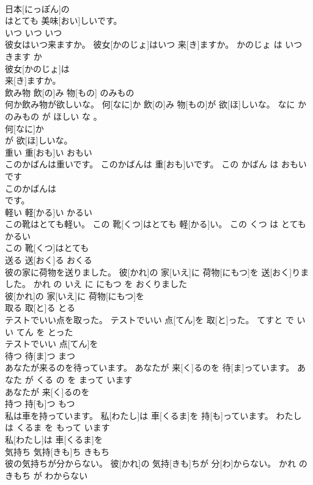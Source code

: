 \documentclass[8pt]{extreport}
\begin{document}
\begin{CJK}{UTF8}{min}
\\	日本[にっぽん]の
\\	はとても 美味[おい]しいです。			
\\	いつ	いつ	いつ	
\\	彼女はいつ来ますか。	彼女[かのじょ]はいつ 来[き]ますか。	かのじょ は いつ きます か	
\\	彼女[かのじょ]は
\\	来[き]ますか。			
\\	飲み物	飲[の]み 物[もの]	のみもの	
\\	何か飲み物が欲しいな。	何[なに]か 飲[の]み 物[もの]が 欲[ほ]しいな。	なに か のみもの が ほしい な 。	
\\	何[なに]か
\\	が 欲[ほ]しいな。			
\\	重い	重[おも]い	おもい	
\\	このかばんは重いです。	このかばんは 重[おも]いです。	この かばん は おもい です	
\\	このかばんは
\\	です。			
\\	軽い	軽[かる]い	かるい	
\\	この靴はとても軽い。	この 靴[くつ]はとても 軽[かる]い。	この くつ は とても かるい	
\\	この 靴[くつ]はとても
\\	送る	送[おく]る	おくる	
\\	彼の家に荷物を送りました。	彼[かれ]の 家[いえ]に 荷物[にもつ]を 送[おく]りました。	かれ の いえ に にもつ を おくりました	
\\	彼[かれ]の 家[いえ]に 荷物[にもつ]を
\\	取る	取[と]る	とる	
\\	テストでいい点を取った。	テストでいい 点[てん]を 取[と]った。	てすと で いい てん を とった	
\\	テストでいい 点[てん]を
\\	待つ	待[ま]つ	まつ	
\\	あなたが来るのを待っています。	あなたが 来[く]るのを 待[ま]っています。	あなた が くる の を まって います	
\\	あなたが 来[く]るのを
\\	持つ	持[も]つ	もつ	
\\	私は車を持っています。	私[わたし]は 車[くるま]を 持[も]っています。	わたし は くるま を もって います	
\\	私[わたし]は 車[くるま]を
\\	気持ち	気持[きも]ち	きもち	
\\	彼の気持ちが分からない。	彼[かれ]の 気持[きも]ちが 分[わ]からない。	かれ の きもち が わからない	

\end{CJK}
\end{document}
